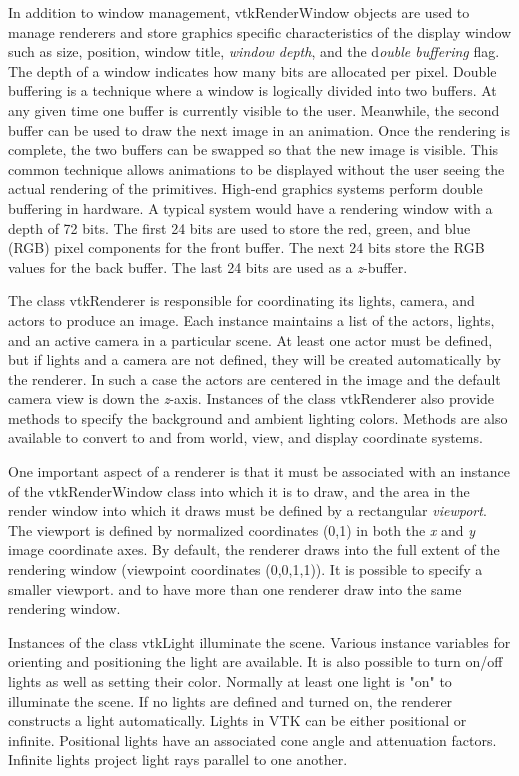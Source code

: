In addition to window management, vtkRenderWindow objects are used to manage renderers and store graphics specific characteristics of the display window such as size, position, window title, \emph{window depth}, and the d\emph{ouble buffering} flag. The depth of a window indicates how many bits are allocated per pixel. Double buffering is a technique where a window is logically divided into two buffers. At any given time one buffer is currently visible to the user. Meanwhile, the second buffer can be used to draw the next image in an animation. Once the rendering is complete, the two buffers can be swapped so that the new image is visible. This common technique allows animations to be displayed without the user seeing the actual rendering of the primitives. High-end graphics systems perform double buffering in hardware. A typical system would have a rendering window with a depth of 72 bits. The first 24 bits are used to store the red, green, and blue (RGB) pixel components for the front buffer. The next 24 bits store the RGB values for the back buffer. The last 24 bits are used as a \emph{z}-buffer.

The class vtkRenderer is responsible for coordinating its lights, camera, and actors to produce an image. Each instance maintains a list of the actors, lights, and an active camera in a particular scene. At least one actor must be defined, but if lights and a camera are not defined, they will be created automatically by the renderer. In such a case the actors are centered in the image and the default camera view is down the \emph{z}-axis. Instances of the class vtkRenderer also provide methods to specify the background and ambient lighting colors. Methods are also available to convert to and from world, view, and display coordinate systems.

One important aspect of a renderer is that it must be associated with an instance of the vtkRenderWindow class into which it is to draw, and the area in the render window into which it draws must be defined by a rectangular \emph{viewport}. The viewport is defined by normalized coordinates (0,1) in both the \emph{x} and \emph{y} image coordinate axes. By default, the renderer draws into the full extent of the rendering window (viewpoint coordinates (0,0,1,1)). It is possible to specify a smaller viewport. and to have more than one renderer draw into the same rendering window.

Instances of the class vtkLight illuminate the scene. Various instance variables for orienting and positioning the light are available. It is also possible to turn on/off lights as well as setting their color. Normally at least one light is "on" to illuminate the scene. If no lights are defined and turned on, the renderer constructs a light automatically. Lights in VTK can be either positional or infinite. Positional lights have an associated cone angle and attenuation factors. Infinite lights project light rays parallel to one another.

